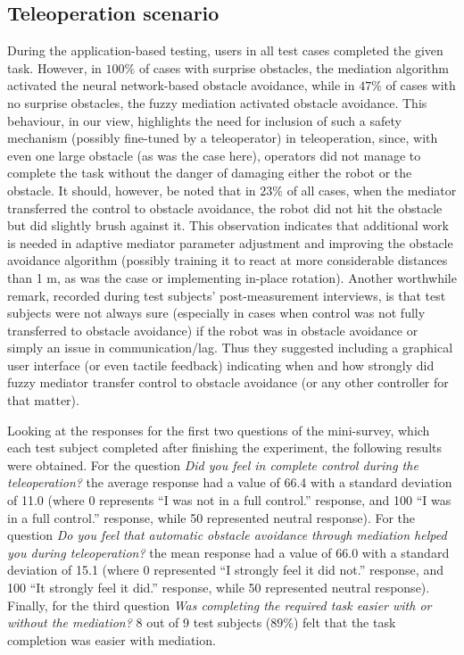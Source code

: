 \subsection{Teleoperation scenario} \label{sec:MediationTeleopResults}

During the application-based testing, users in all test cases completed the given task. However, in $100\%$ of cases with surprise obstacles, the mediation algorithm activated the neural network-based obstacle avoidance, while in $47\%$ of cases with no surprise obstacles, the fuzzy mediation activated obstacle avoidance. This behaviour, in our view, highlights the need for inclusion of such a safety mechanism (possibly fine-tuned by a teleoperator) in teleoperation, since, with even one large obstacle (as was the case here), operators did not manage to complete the task without the danger of damaging either the robot or the obstacle. It should, however, be noted that in $23\%$ of all cases, when the mediator transferred the control to obstacle avoidance, the robot did not hit the obstacle but did slightly brush against it. This observation indicates that additional work is needed in adaptive mediator parameter adjustment and improving the obstacle avoidance algorithm (possibly training it to react at more considerable distances than 1 m, as was the case or implementing in-place rotation). Another worthwhile remark, recorded during test subjects' post-measurement interviews, is that test subjects were not always sure (especially in cases when control was not fully transferred to obstacle avoidance) if the robot was in obstacle avoidance or simply an issue in communication/lag. Thus they suggested including a graphical user interface (or even tactile feedback) indicating when and how strongly did fuzzy mediator transfer control to obstacle avoidance (or any other controller for that matter).



Looking at the responses for the first two questions of the mini-survey, which each test subject completed after finishing the experiment, the following results were obtained. For the question \emph{Did you feel in complete control during the teleoperation?} the average response had a value of 66.4 with a standard deviation of 11.0 (where 0 represents ``I was not in a full control.'' response, and 100 ``I was in a full control.'' response, while 50 represented neutral response). For the question \emph{Do you feel that automatic obstacle avoidance through mediation helped you during teleoperation?} the mean response had a value of 66.0 with a standard deviation of 15.1 (where 0 represented ``I strongly feel it did not.'' response, and 100 ``It strongly feel it did.'' response, while 50 represented neutral response). Finally, for the third question \emph{Was completing the required task easier with or without the mediation?} 8 out of 9 test subjects ($89\%$) felt that the task completion was easier with mediation.

